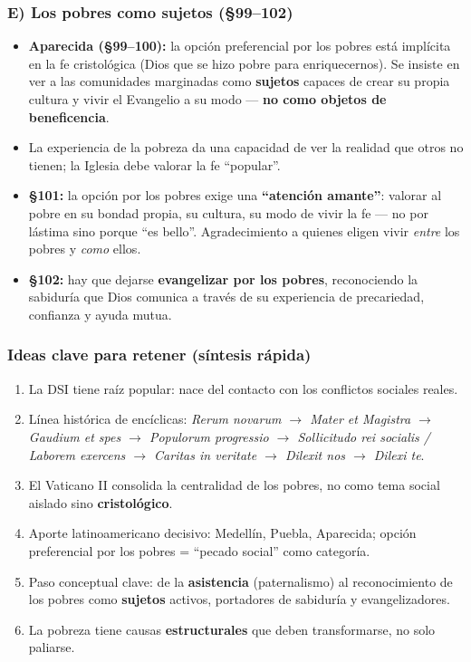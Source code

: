 \documentclass[10pt,a4paper]{article}
\begin{document}
\subsubsection{E) Los pobres como sujetos (\S{}99--102)}
\begin{itemize}
\item \textbf{Aparecida (\S{}99--100):} la opción preferencial por los pobres está implícita en la fe cristológica (Dios que se hizo pobre para enriquecernos). Se insiste en ver a las comunidades marginadas como \textbf{sujetos} capaces de crear su propia cultura y vivir el Evangelio a su modo --- \textbf{no como objetos de beneficencia}.
\item La experiencia de la pobreza da una capacidad de ver la realidad que otros no tienen; la Iglesia debe valorar la fe ``popular''.
\item \textbf{\S{}101:} la opción por los pobres exige una \textbf{``atención amante''}: valorar al pobre en su bondad propia, su cultura, su modo de vivir la fe --- no por lástima sino porque ``es bello''. Agradecimiento a quienes eligen vivir \textit{entre} los pobres y \textit{como} ellos.
\item \textbf{\S{}102:} hay que dejarse \textbf{evangelizar por los pobres}, reconociendo la sabiduría que Dios comunica a través de su experiencia de precariedad, confianza y ayuda mutua.
\end{itemize}

\subsubsection{Ideas clave para retener (síntesis rápida)}
\begin{enumerate}
\item La DSI tiene raíz popular: nace del contacto con los conflictos sociales reales.
\item Línea histórica de encíclicas: \textit{Rerum novarum $\rightarrow$ Mater et Magistra $\rightarrow$ Gaudium et spes $\rightarrow$ Populorum progressio $\rightarrow$ Sollicitudo rei socialis / Laborem exercens $\rightarrow$ Caritas in veritate $\rightarrow$ Dilexit nos $\rightarrow$ Dilexi te}.
\item El Vaticano II consolida la centralidad de los pobres, no como tema social aislado sino \textbf{cristológico}.
\item Aporte latinoamericano decisivo: Medellín, Puebla, Aparecida; opción preferencial por los pobres = ``pecado social'' como categoría.
\item Paso conceptual clave: de la \textbf{asistencia} (paternalismo) al reconocimiento de los pobres como \textbf{sujetos} activos, portadores de sabiduría y evangelizadores.
\item La pobreza tiene causas \textbf{estructurales} que deben transformarse, no solo paliarse.
\end{enumerate}
\end{document}
